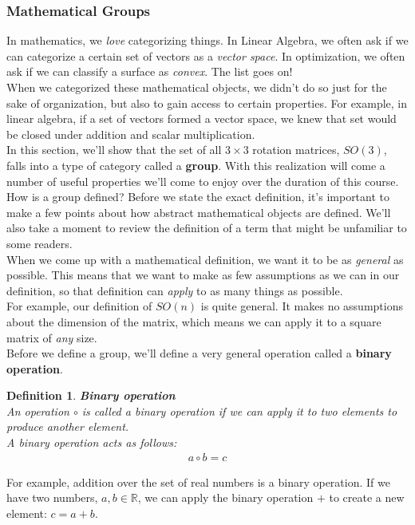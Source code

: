 \documentclass[oneside]{book}
\newtheorem{definition}{Definition}
\newenvironment{defn} %
  {\colorlet{shadecolor}{orange!15}\begin{shaded}\begin{definition}}
  {\end{definition}\end{shaded}}
\begin{document}
\subsubsection{Mathematical Groups}
In mathematics, we \textit{love} categorizing things. In Linear Algebra, we often ask if we can categorize a certain set of vectors as a \textit{vector space}. In optimization, we often ask if we can classify a surface as \textit{convex}. The list goes on!\\
When we categorized these mathematical objects, we didn't do so just for the sake of organization, but also to gain access to certain properties. For example, in linear algebra, if a set of vectors formed a vector space, we knew that set would be closed under addition and scalar multiplication.\\
In this section, we'll show that the set of all $3\times 3$ rotation matrices, $SO(3)$, falls into a type of category called a \textbf{group}. With this realization will come a number of useful properties we'll come to enjoy over the duration of this course.\\
How is a group defined? Before we state the exact definition, it's important to make a few points about how abstract mathematical objects are defined. We'll also take a moment to review the definition of a term that might be unfamiliar to some readers.\\
When we come up with a mathematical definition, we want it to be as \textit{general} as possible. This means that we want to make as few assumptions as we can in our definition, so that definition can \textit{apply} to as many things as possible.\\
For example, our definition of $SO(n)$ is quite general. It makes no assumptions about the dimension of the matrix, which means we can apply it to a square matrix of \textit{any} size.\\
Before we define a group, we'll define a very general operation called a \textbf{binary operation}.
\begin{defn}
\textbf{Binary operation}\\
An operation $\circ$ is called a binary operation if we can apply it to two elements to produce another element.\\
A binary operation acts as follows:
\begin{align}
    a\circ b = c
\end{align}
\end{defn}\noindent
For example, addition over the set of real numbers is a binary operation. If we have two numbers, $a, b \in \mathbb{R}$, we can apply the binary operation $+$ to create a new element: $c = a + b$.\\
\end{document}
